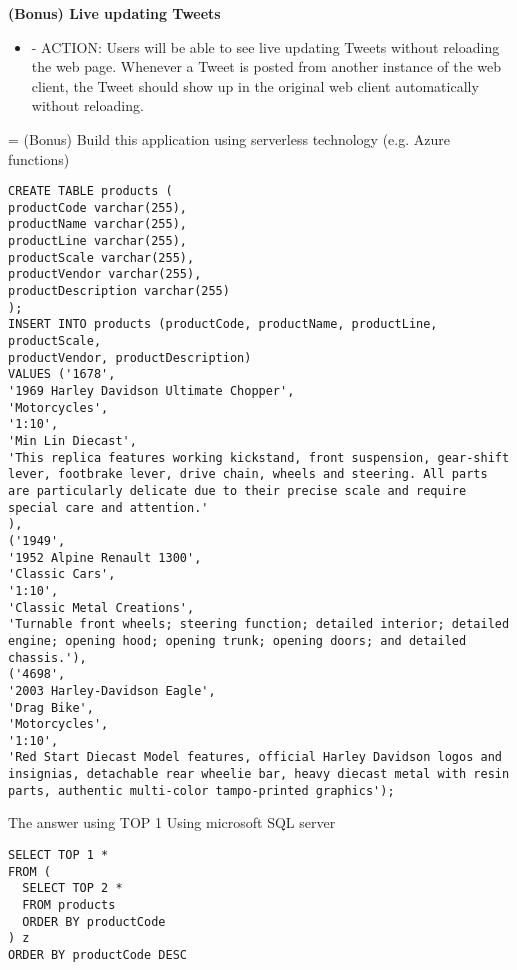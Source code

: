 \textbf{(Bonus) Live updating Tweets}
\begin{itemize}
\item - ACTION: Users will be able to see live updating Tweets without reloading the web page. Whenever
a Tweet is posted from another instance of the web client, the Tweet should show up in the original
web client automatically without reloading.
\end{itemize}
= (Bonus) Build this application using serverless technology (e.g. Azure functions)

\begin{lstlisting}[caption={SQL Query for KPMG Interview}]
CREATE TABLE products (
productCode varchar(255),
productName varchar(255),
productLine varchar(255),
productScale varchar(255),
productVendor varchar(255),
productDescription varchar(255)
);
INSERT INTO products (productCode, productName, productLine, productScale,
productVendor, productDescription)
VALUES ('1678',
'1969 Harley Davidson Ultimate Chopper',
'Motorcycles',
'1:10',
'Min Lin Diecast',
'This replica features working kickstand, front suspension, gear-shift lever, footbrake lever, drive chain, wheels and steering. All parts are particularly delicate due to their precise scale and require special care and attention.'
),
('1949',
'1952 Alpine Renault 1300',
'Classic Cars',
'1:10',
'Classic Metal Creations',
'Turnable front wheels; steering function; detailed interior; detailed engine; opening hood; opening trunk; opening doors; and detailed chassis.'),
('4698',
'2003 Harley-Davidson Eagle',
'Drag Bike',
'Motorcycles',
'1:10',
'Red Start Diecast Model features, official Harley Davidson logos and insignias, detachable rear wheelie bar, heavy diecast metal with resin parts, authentic multi-color tampo-printed graphics');
\end{lstlisting}

The answer using TOP 1 Using microsoft SQL server
\begin{lstlisting}[caption={SQL Query for KPMG Interview -- Answer}]
SELECT TOP 1 *
FROM (
  SELECT TOP 2 * 
  FROM products
  ORDER BY productCode
) z
ORDER BY productCode DESC
\end{lstlisting}